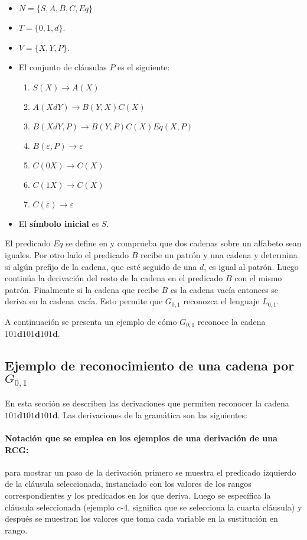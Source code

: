 \begin{itemize}
    \item $N=\{S,A,B,C,Eq\}$
    \item $T=\{0,1,d\}$.
    \item $V=\{X,Y,P\}$.
    \item El conjunto de cláusulas $P$ es el siguiente:
          \begin{enumerate}
              \item $S(X)\to A(X)$
              \item $A(XdY)\to B(Y,X)C(X)$
              \item $B(XdY,P)\to B(Y,P) C(X) Eq(X,P)$
              \item $B(\varepsilon,P)\to \varepsilon$
              \item $C(0X)\to C(X)$
              \item $C(1X)\to C(X)$
              \item $C(\varepsilon)\to \varepsilon$
          \end{enumerate}
    \item El \textbf{símbolo inicial} es $S$.
\end{itemize}

El predicado $Eq$ se define en \cite{mainRCGBib} y comprueba que dos cadenas sobre un alfabeto sean iguales.
Por otro lado el predicado $B$ recibe un patrón y una cadena y determina si algún prefijo de la cadena,
que esté seguido de una $d$, es igual al patrón. Luego continúa la derivación del resto de la cadena en el
predicado $B$ con el mismo patrón. Finalmente si la cadena que recibe $B$ es la cadena vacía entonces se
deriva en la cadena vacía. Esto permite que $G_{0,1}$ reconozca el lenguaje $L_{0,1}$.

A continuación se presenta un ejemplo de cómo $G_{0,1}$ reconoce la cadena $101\mathbf{d}101\mathbf{d}101\mathbf{d}$.

\subsection{Ejemplo de reconocimiento de una cadena por $G_{0,1}$}

En esta sección se describen las derivaciones que permiten reconocer la cadena $101\mathbf{d}101\mathbf{d}101\mathbf{d}$. Las derivaciones
de la gramática son las siguientes:

\paragraph{Notación que se emplea en los ejemplos de una derivación de una RCG:} para mostrar un paso de la
derivación primero se muestra el predicado izquierdo de la cláusula seleccionada, instanciado con los valores
de los rangos correspondientes y los predicados en los que deriva. Luego se específica la cláusula seleccionada
(ejemplo c-4, significa que se selecciona la cuarta cláusula) y después se muestran los valores que toma cada
variable en la sustitución en rango.

